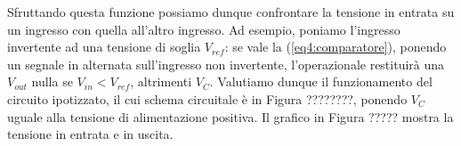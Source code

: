 Sfruttando questa funzione possiamo dunque confrontare la tensione in entrata su un ingresso con quella all'altro ingresso. Ad esempio, poniamo l'ingresso invertente ad una tensione di soglia $V_{ref}$: se vale la (\ref{eq4:comparatore}), ponendo un segnale in alternata sull'ingresso non invertente, l'operazionale restituirà una $V_{out}$ nulla se $V_{in}<V_{ref}$, altrimenti $V_C$. Valutiamo dunque il funzionamento del circuito ipotizzato, il cui schema circuitale è in Figura ????????, ponendo $V_{C}$ uguale alla tensione di alimentazione positiva. Il grafico in Figura ????? mostra la tensione in entrata e in uscita.